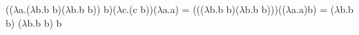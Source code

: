 \documentclass{article}
\begin{document}
   
   (($\lambda$a.($\lambda$b.b b)($\lambda$b.b b)) b)($\lambda$c.(c b))($\lambda$a.a) =
   ((($\lambda$b.b b)($\lambda$b.b b)))(($\lambda$a.a)b) =  ($\lambda$b.b b) ($\lambda$b.b b) b
\end{document}
